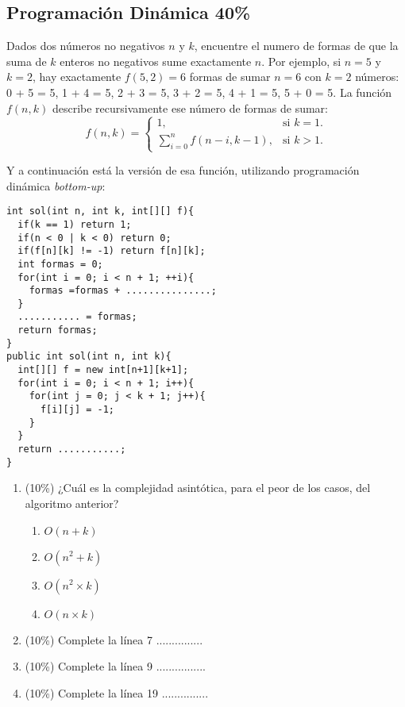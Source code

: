 \documentclass[10 pt]{article}
\begin{document}
\begin{multicols}{2}
\section{Programación Dinámica 40\%}
\columnbreak

Dados dos números no negativos $n$ y $k$, encuentre el numero de formas de que la suma de $k$ enteros no negativos sume exactamente $n$. Por ejemplo, si $n = 5$ y $k = 2$, hay exactamente $f(5,2)=6$ formas de sumar $n=6$ con $k=2$ números: 0 + 5 = 5, 1 + 4 = 5, 2 + 3 = 5, 3 + 2 = 5, 4 + 1 = 5, 5 + 0 = 5. La función $f(n,k)$ describe recursivamente ese número de formas de sumar:
\begin{equation}
f(n, k)=\begin{cases}
1, & \text{si $k=1$}.\\
\sum_{i = 0}^{n} f(n - i, k - 1), & \text{si $k > 1$}.
\end{cases}
\end{equation}

Y a continuación está la versión de esa función, utilizando programación
dinámica \emph{bottom-up}:

\begin{lstlisting}
int sol(int n, int k, int[][] f){
  if(k == 1) return 1;
  if(n < 0 | k < 0) return 0;
  if(f[n][k] != -1) return f[n][k];
  int formas = 0;
  for(int i = 0; i < n + 1; ++i){
    formas =formas + ...............;
  }
  ........... = formas;
  return formas;
}
public int sol(int n, int k){
  int[][] f = new int[n+1][k+1];
  for(int i = 0; i < n + 1; i++){
    for(int j = 0; j < k + 1; j++){
      f[i][j] = -1;
    }
  }
  return ...........;
}
\end{lstlisting}
\begin{enumerate}[label=\alph*)]
	\item (10\%) ¿Cuál es la complejidad asintótica, para el peor de los casos, del algoritmo anterior?
	\begin{enumerate}[label=(\roman*)]
		\item $O(n + k)$
		\item $O(n^2 + k)$
		\item $O(n^2 \times k)$
		\item $O(n \times k)$
	\end{enumerate}
	\item (10\%) Complete la línea 7 ...............	
	\item (10\%) Complete la línea 9 ................
	\item (10\%) Complete la línea 19 ...............
\end{enumerate}
\end{multicols}
\end{document}
